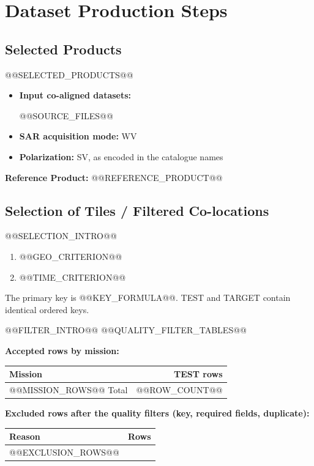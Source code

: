 \documentclass[11pt,a4paper]{article}
\begin{document}
\section{Dataset Production Steps}
\subsection{Selected Products}
@@SELECTED_PRODUCTS@@
\begin{itemize}
    \item \textbf{Input co-aligned datasets:}
    \begin{itemize}
@@SOURCE_FILES@@
    \end{itemize}
    \item \textbf{SAR acquisition mode:} WV
    \item \textbf{Polarization:} SV, as encoded in the catalogue names
\end{itemize}
\textbf{Reference Product:} @@REFERENCE_PRODUCT@@

\subsection{Selection of Tiles / Filtered Co-locations}
@@SELECTION_INTRO@@
\begin{enumerate}
    \item @@GEO_CRITERION@@
    \item @@TIME_CRITERION@@
\end{enumerate}
The primary key is @@KEY_FORMULA@@. TEST and TARGET contain identical ordered keys.

@@FILTER_INTRO@@
@@QUALITY_FILTER_TABLES@@

\textbf{Accepted rows by mission:}
\begin{table}[H]
    \centering
    \begin{tabular}{lr}
        \toprule
        \textbf{Mission} & \textbf{TEST rows} \\
        \midrule
@@MISSION_ROWS@@
        \midrule
        Total & @@ROW_COUNT@@ \\
        \bottomrule
    \end{tabular}
\end{table}

\textbf{Excluded rows after the quality filters (key, required fields, duplicate):}
\begin{table}[H]
    \centering
    \begin{tabular}{lr}
        \toprule
        \textbf{Reason} & \textbf{Rows} \\
        \midrule
@@EXCLUSION_ROWS@@
        \bottomrule
    \end{tabular}
\end{table}
\end{document}
